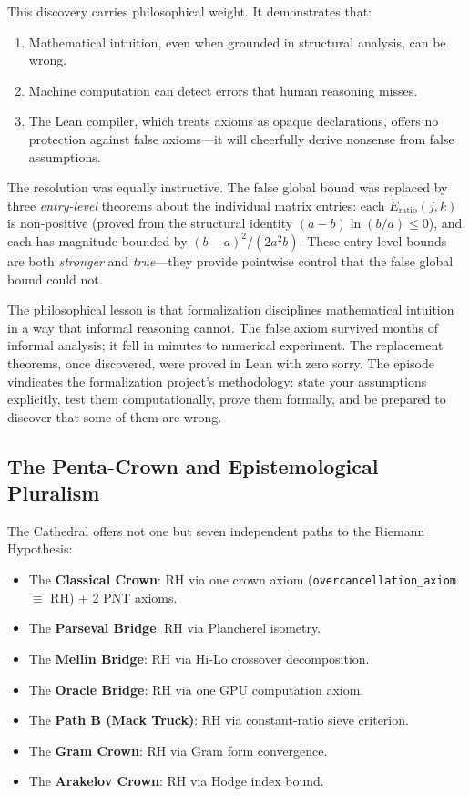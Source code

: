 This discovery carries philosophical weight. It demonstrates that:
\begin{enumerate}
  \item Mathematical intuition, even when grounded in structural
    analysis, can be wrong.
  \item Machine computation can detect errors that human reasoning
    misses.
  \item The Lean compiler, which treats axioms as opaque declarations,
    offers no protection against false axioms---it will cheerfully
    derive nonsense from false assumptions.
\end{enumerate}

The resolution was equally instructive. The false global bound was
replaced by three \emph{entry-level} theorems about the individual
matrix entries: each $E_{\mathrm{ratio}}(j,k)$ is non-positive
(proved from the structural identity $(a-b)\ln(b/a) \leq 0$), and
each has magnitude bounded by $(b-a)^2/(2a^2b)$. These entry-level
bounds are both \emph{stronger} and \emph{true}---they provide
pointwise control that the false global bound could not.

The philosophical lesson is that formalization disciplines
mathematical intuition in a way that informal reasoning cannot.
The false axiom survived months of informal analysis; it fell in
minutes to numerical experiment. The replacement theorems, once
discovered, were proved in Lean with zero sorry. The episode
vindicates the formalization project's methodology: state your
assumptions explicitly, test them computationally, prove them
formally, and be prepared to discover that some of them are wrong.

\subsection{The Penta-Crown and Epistemological Pluralism}

The Cathedral offers not one but seven independent paths to the
Riemann Hypothesis:
\begin{itemize}
  \item The \textbf{Classical Crown}: RH via one crown axiom
    (\texttt{overcancellation\_axiom} $\equiv$ RH) + 2 PNT axioms.
  \item The \textbf{Parseval Bridge}: RH via Plancherel isometry.
  \item The \textbf{Mellin Bridge}: RH via Hi-Lo crossover decomposition.
  \item The \textbf{Oracle Bridge}: RH via one GPU computation axiom.
  \item The \textbf{Path B (Mack Truck)}: RH via constant-ratio sieve criterion.
  \item The \textbf{Gram Crown}: RH via Gram form convergence.
  \item The \textbf{Arakelov Crown}: RH via Hodge index bound.
\end{itemize}

